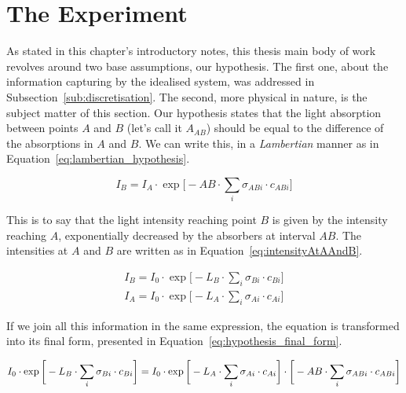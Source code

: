 \section{The Experiment}%
\label{sec:the_experiment}

As stated in this chapter's introductory notes, this thesis main body of
work revolves around two base assumptions, our hypothesis. The first
one, about the information capturing by the idealised system, was
addressed in Subsection~\ref{sub:discretisation}. The second, more
physical in nature, is the subject matter of this section. Our
hypothesis states that the light absorption between points $A$ and $B$
(let's call it $A_{AB}$) should be equal to the difference of the
absorptions in $A$ and $B$. We can write this, in a \emph{Lambertian}
manner as in Equation~\ref{eq:lambertian_hypothesis}.

\begin{equation}
    \label{eq:lambertian_hypothesis}
    I_B = I_A \cdot \exp \bigg[-AB \cdot \sum_i \sigma_{ABi} \cdot
    c_{ABi}\bigg]
\end{equation}

This is to say that the light intensity reaching point $B$ is given by
the intensity reaching $A$, exponentially decreased by the absorbers at
interval $AB$. The intensities at $A$ and $B$ are written as in
Equation~\ref{eq:intensityAtAAndB}.

\begin{equation}
    \begin{aligned}
        \label{eq:intensityAtAAndB}
        I_B = I_0 \cdot \exp \bigg[ -L_B \cdot \sum_i \sigma_{Bi} \cdot
        c_{Bi} \bigg]\\
        I_A = I_0 \cdot \exp \bigg[ -L_A \cdot \sum_i \sigma_{Ai} \cdot
        c_{Ai} \bigg]
    \end{aligned}
\end{equation}

If we join all this information in the same expression, the equation is
transformed into its final form, presented in
Equation~\ref{eq:hypothesis_final_form}.

\begin{equation}
    \small
    \label{eq:hypothesis_final_form}
    I_0 \cdot \exp \bigg[ -L_B \cdot \sum_i \sigma_{Bi} \cdot
            c_{Bi} \bigg] = I_0 \cdot \exp \bigg[ -L_A \cdot \sum_i \sigma_{Ai} \cdot
            c_{Ai} \bigg] \cdot \bigg[-AB \cdot \sum_i \sigma_{ABi} \cdot
            c_{ABi}\bigg]
\end{equation}

